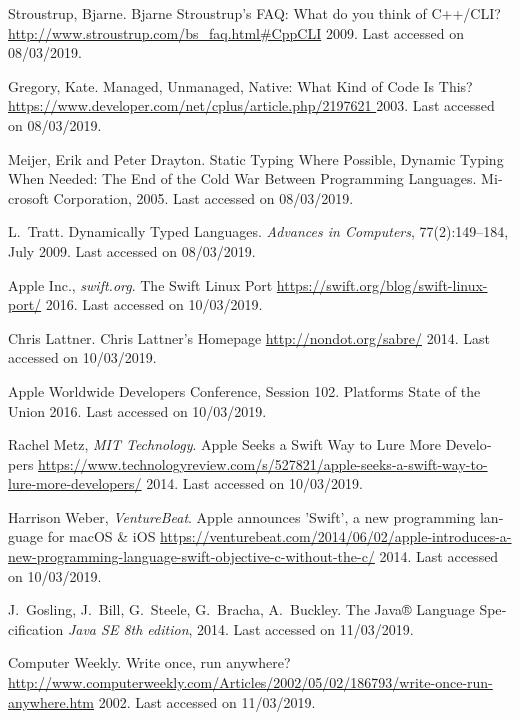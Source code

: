 \begin{thebibliography}{1}
\bibitem{[STR+09]} {\textlatin{
{Stroustrup, Bjarne}.
Bjarne Stroustrup's FAQ: What do you think of C++/CLI?
\url{http://www.stroustrup.com/bs_faq.html#CppCLI}
  2009. Last accessed on 08/03/2019}}.
  
\bibitem{[DEV+03]} {\textlatin{
{Gregory, Kate}.
Managed, Unmanaged, Native: What Kind of Code Is This?
\url{https://www.developer.com/net/cplus/article.php/2197621 }
  2003. Last accessed on 08/03/2019}}.
  
\bibitem{[MIC05]} {\textlatin{
Meijer, Erik and Peter Drayton. Static Typing Where Possible, Dynamic Typing When Needed: The End of the Cold War Between Programming Languages. Microsoft Corporation, 2005. Last accessed on 08/03/2019}}.  

\bibitem{[ADV09]} {\textlatin{
L.~Tratt. Dynamically Typed Languages. {\em Advances in Computers}, 77(2):149--184, July 2009. Last accessed on 08/03/2019}}.  
 
\bibitem{[SWIFT1+16]} {\textlatin{
{Apple Inc., {\em swift.org}}.
The Swift Linux Port
\url{https://swift.org/blog/swift-linux-port/}
  2016. Last accessed on 10/03/2019}}.
  
\bibitem{[SWIFT2+14]} {\textlatin{
{Chris Lattner}.
Chris Lattner's Homepage
\url{http://nondot.org/sabre/}
  2014. Last accessed on 10/03/2019}}.
  
\bibitem{[SWIFT3+14]} {\textlatin{
{Apple Worldwide Developers Conference, Session 102}.
Platforms State of the Union
  2016. Last accessed on 10/03/2019}}.

\bibitem{[SWIFT4]} {\textlatin{
{ Rachel Metz, {\em MIT Technology}}.
Apple Seeks a Swift Way to Lure More Developers
\url{https://www.technologyreview.com/s/527821/apple-seeks-a-swift-way-to-lure-more-developers/}
  2014. Last accessed on 10/03/2019}}.
  
\bibitem{[SWIFT5]} {\textlatin{
{Harrison Weber, {\em VentureBeat}}.
Apple announces 'Swift', a new programming language for macOS & iOS
\url{https://venturebeat.com/2014/06/02/apple-introduces-a-new-programming-language-swift-objective-c-without-the-c/}
  2014. Last accessed on 10/03/2019}}.

\bibitem{[JAVA1]} {\textlatin{
{J.~Gosling, J.~Bill, G.~Steele, G.~Bracha, A.~Buckley}.
The Java® Language Specification
{\em Java SE 8th edition}, 2014. Last accessed on 11/03/2019}}.

\bibitem{[JAVA2]} {\textlatin{
{Computer Weekly}.
Write once, run anywhere?
\url{http://www.computerweekly.com/Articles/2002/05/02/186793/write-once-run-anywhere.htm}
  2002. Last accessed on 11/03/2019}}.
  

\end{thebibliography}
